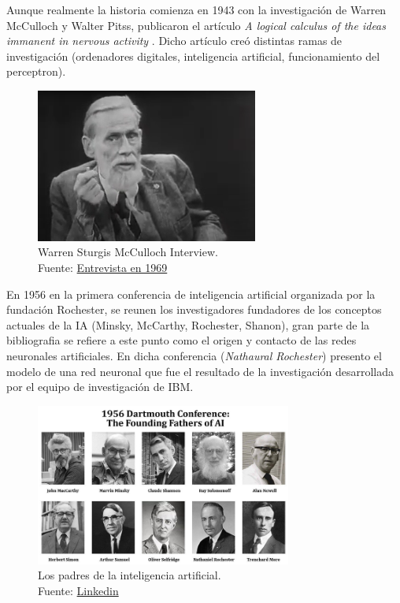 Aunque realmente la historia comienza en 1943 con la investigación de {Warren McCulloch} y {Walter Pitss}, publicaron el artículo \textit{A logical calculus of the ideas immanent in nervous activity} \cite{mcculloch1943logical}.
Dicho artículo creó distintas ramas de investigación (ordenadores digitales, inteligencia artificial, funcionamiento del perceptron).

\begin{figure}[H]
  \centering
  \includegraphics[width=0.65\textwidth]{figures/Warren Sturgis McCulloch Interview.png}
  \caption{Warren Sturgis McCulloch Interview. \\Fuente: \href{https://www.youtube.com/watch?v=8Wdz1Tj5084}{Entrevista en 1969}}
  \label{fig:Warren Sturgis McCulloch}
\end{figure}


En 1956 en la primera conferencia de inteligencia artificial organizada por la fundación {Rochester}, se reunen los investigadores fundadores de los conceptos actuales de la IA ({Minsky, McCarthy, Rochester, Shanon}), gran parte de la bibliografia se refiere a este punto como el origen y contacto de las redes neuronales artificiales.
En dicha conferencia (\textit{Nathaural Rochester}) presento el modelo de una red neuronal que fue el resultado de la investigación desarrollada por el equipo de investigación de IBM.

\begin{figure}[H]
  \centering
  \includegraphics[width=0.75\textwidth]{figures/conferecia 1956 - 1689170718524.png}
  \caption{Los padres de la inteligencia artificial. \\Fuente: \href{https://www.linkedin.com/pulse/first-ever-ai-conference-tracing-evolution-history-ofai-nicky-verd}{Linkedin}}
  \label{fig:conferencia-1956}
\end{figure}

